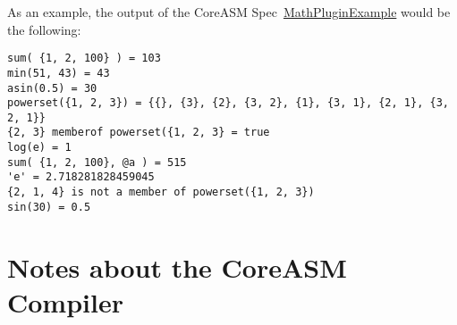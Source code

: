 \documentclass{article}
\newcommand{\CoreASM}{{\sffamily CoreASM}\xspace}
\begin{document}
As an example, the output of the \CoreASM Spec~\hyperref[spec:mathexample]{MathPluginExample} would be the following:

\newenvironment{shell}
	{\noindent \color{shellgray}\vspace{0.2cm} \begin{minipage}{0.9\textwidth} \vspace{0.2cm}}
	{\vspace{0.2cm} \end{minipage} \vspace{0.2cm} \color{black}}

\begin{shell}
\begin{verbatim}
sum( {1, 2, 100} ) = 103
min(51, 43) = 43
asin(0.5) = 30
powerset({1, 2, 3}) = {{}, {3}, {2}, {3, 2}, {1}, {3, 1}, {2, 1}, {3, 2, 1}}
{2, 3} memberof powerset({1, 2, 3} = true
log(e) = 1
sum( {1, 2, 100}, @a ) = 515
'e' = 2.718281828459045
{2, 1, 4} is not a member of powerset({1, 2, 3})
sin(30) = 0.5
\end{verbatim}
\end{shell}

\section{Notes about the \CoreASM Compiler}
\label{sec:compiler}
\end{document}
